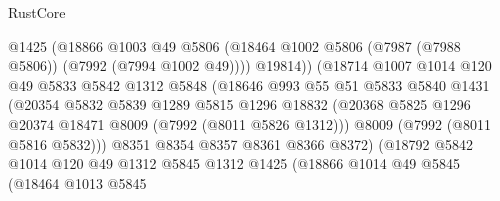 \begin{lexlean}{RustCore}
\begin{coremodule}
                                @1425
                                (@18866
                                  @1003
                                  @49
                                  @5806
                                  (@18464
                                    @1002
                                    @5806
                                    (@7987 (@7988 @5806))
                                    (@7992 (@7994 @1002 @49))))
                                @19814))
                            (@18714
                              @1007
                              @1014
                              @120
                              @49
                              @5833
                              @5842
                              @1312
                              @5848
                              (@18646
                                @993
                                @55
                                @51
                                @5833
                                @5840
                                @1431
                                (@20354
                                  @5832
                                  @5839
                                  @1289
                                  @5815
                                  @1296
                                  @18832
                                  (@20368
                                    @5825
                                    @1296
                                    @20374
                                    @18471
                                    @8009
                                    (@7992 (@8011 @5826 @1312)))
                                  @8009
                                  (@7992 (@8011 @5816 @5832)))
                                @8351
                                @8354
                                @8357
                                @8361
                                @8366
                                @8372)
                              (@18792
                                @5842
                                @1014
                                @120
                                @49
                                @1312
                                @5845
                                @1312
                                @1425
                                (@18866
                                  @1014
                                  @49
                                  @5845
                                  (@18464
                                    @1013
                                    @5845

\end{coremodule}
\end{lexlean}
